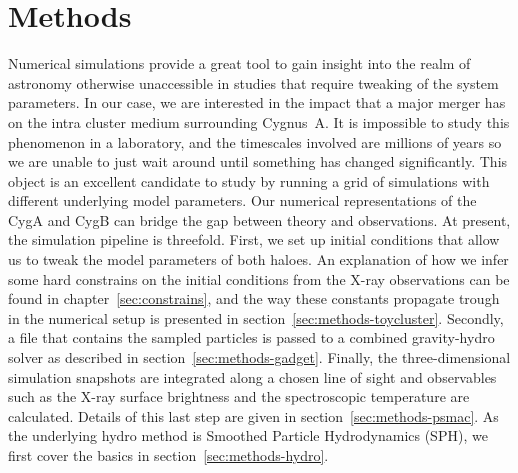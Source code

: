 \documentclass[MScProj_TLRH_ClusterEnergy.tex]{subfiles}
\begin{document}
\chapter{Methods}
\label{sec:methods}

Numerical simulations provide a great tool to gain insight into the realm of
astronomy otherwise unaccessible in studies that require tweaking of the system
parameters. In our case, we are interested in the impact that a major merger has
on the intra cluster medium surrounding Cygnus~A. It is impossible to study this 
phenomenon in a laboratory, and the timescales involved are millions of years so
we are unable to just wait around until something has changed significantly. This 
object is an excellent candidate to study by running a grid of simulations 
with different underlying model parameters. Our numerical representations of the
CygA and CygB can bridge the gap between theory and observations. At present, 
the simulation pipeline is threefold. First, we set up initial conditions that
allow us to tweak the model parameters of both haloes. An explanation of how we
infer some hard constrains on the initial conditions from the X-ray observations 
can be found in chapter~\ref{sec:constrains}, and the way these constants propagate
trough in the numerical setup is presented in section~\ref{sec:methods-toycluster}.
Secondly, a file that contains the sampled particles is passed to a combined 
gravity-hydro solver as described in section~\ref{sec:methods-gadget}.
Finally, the three-dimensional simulation snapshots are integrated along a 
chosen line of sight and observables such as the X-ray surface brightness and 
the spectroscopic temperature are calculated. Details of this last step are given 
in section~\ref{sec:methods-psmac}. As the underlying hydro method is Smoothed
Particle Hydrodynamics (SPH), we first cover the basics in 
section~\ref{sec:methods-hydro}.
\end{document}
